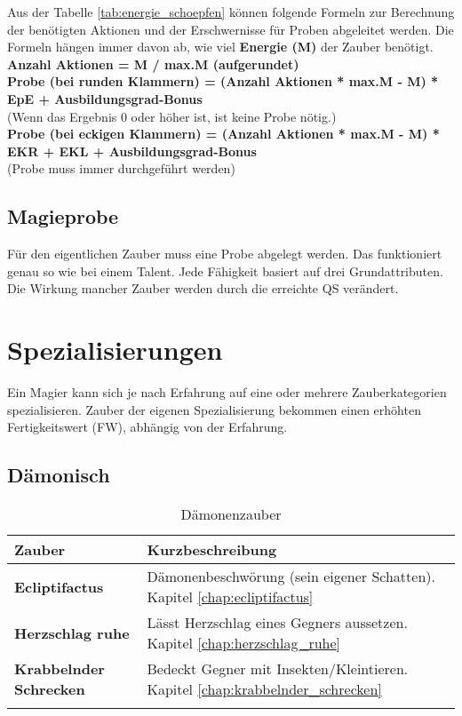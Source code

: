 Aus der Tabelle \ref{tab:energie_schoepfen} können folgende Formeln zur Berechnung der benötigten Aktionen und der Erschwernisse für Proben abgeleitet werden. Die Formeln hängen immer davon ab, wie viel \textbf{Energie (M)} der Zauber benötigt. \\

\textbf{Anzahl Aktionen = M / max.M (aufgerundet)} \\

\textbf{Probe (bei runden Klammern) = (Anzahl Aktionen * max.M - M) * EpE + Ausbildungsgrad-Bonus} \\
(Wenn das Ergebnis 0 oder höher ist, ist keine Probe nötig.) \\

\textbf{Probe (bei eckigen Klammern) = (Anzahl Aktionen * max.M - M) * EKR + EKL + Ausbildungsgrad-Bonus} \\
(Probe muss immer durchgeführt werden) 

\subsection{Magieprobe}
\label{chap:magieprobe}
Für den eigentlichen Zauber muss eine Probe abgelegt werden. Das funktioniert genau so wie bei einem Talent. Jede Fähigkeit basiert auf drei Grundattributen. Die Wirkung mancher Zauber werden durch die erreichte QS verändert.


\section{Spezialisierungen}
Ein Magier kann sich je nach Erfahrung auf eine oder mehrere Zauberkategorien spezialisieren. Zauber der eigenen Spezialisierung bekommen einen erhöhten Fertigkeitswert (FW), abhängig von der Erfahrung.

\subsection{Dämonisch}
\begin{longtable}{|p{5cm}|p{10cm}|}
\hline
\textbf{Zauber} & \textbf{Kurzbeschreibung} \\ \hline

\textbf{Ecliptifactus} & Dämonenbeschwörung (sein eigener Schatten). Kapitel \ref{chap:ecliptifactus} \\ \hline

\textbf{Herzschlag ruhe} & Lässt Herzschlag eines Gegners aussetzen. Kapitel \ref{chap:herzschlag_ruhe} \\ \hline

\textbf{Krabbelnder Schrecken} & Bedeckt Gegner mit Insekten/Kleintieren. Kapitel \ref{chap:krabbelnder_schrecken} \\ \hline

\caption{Dämonenzauber}
\label{tab:daemonenzauber}
\end{longtable}



